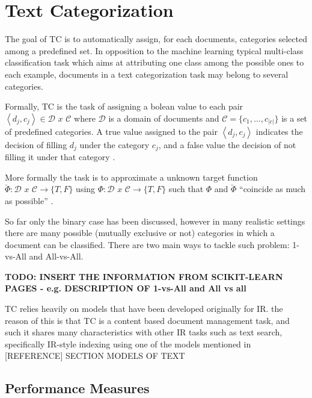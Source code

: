 
\section{Text Categorization}
\label{sec:rel_text_categorization}

The goal of \ac{TC} is to automatically assign, for each
documents, categories selected among a predefined set.
In opposition to the machine learning typical multi-class classification
task which aims at attributing one class among the possible ones to each
example, documents in a text categorization task may belong to several
categories. 


Formally,  \ac{TC} is the  task of  assigning a bolean value to each pair 
$\left\langle d_{j},c_{j}\right\rangle \in\mathcal{D}\,\, x\,\mathcal{\, C}$
where  $\mathcal{D}$  is a domain of documents and
$\mathcal{C}=\{c_{1},\ldots,c_{|c|}\}$ is a set of predefined categories. A
true value assigned to the pair $\left\langle d_{j},c_{j}\right\rangle $
indicates the decision of filling  $d_{j}$ under the category  $c_{j}$, and
a false value the decision of not filling it under that category \cite{Sebastiani02}. 

More formally the task is to approximate a unknown target function 
 $\breve{\Phi}:\mathcal{D}\,\, x\,\mathcal{\, C}\rightarrow\{T,F\}$  using 
 $\Phi:\mathcal{D}\,\, x\,\mathcal{\, C}\rightarrow\{T,F\}$  such that 
 $\Phi$ and  $\breve{\Phi}$ ``coincide as much as possible'' \cite{Sebastiani02}. 

So far only the binary case has been discussed, however in many realistic
settings there are many possible (mutually exclusive or not) categories in
which a document can be classified.  There are two main ways to  tackle
such problem: 1-vs-All and All-vs-All. 

\textbf{TODO: INSERT THE INFORMATION FROM SCIKIT-LEARN PAGES - e.g.
  DESCRIPTION OF 1-vs-All and All vs all}

\ac{TC} relies  heavily on  models that have been developed originally for \ac{IR}.
 the reason of this is that TC is a content based document management task,
 and such it shares many characteristics with other IR tasks such as text
 search, specifically \ac{IR}-style indexing using one of the models mentioned  in 
 [REFERENCE] SECTION MODELS OF TEXT



\subsection{Performance Measures}
\label{sec:sub_performance_measures}

